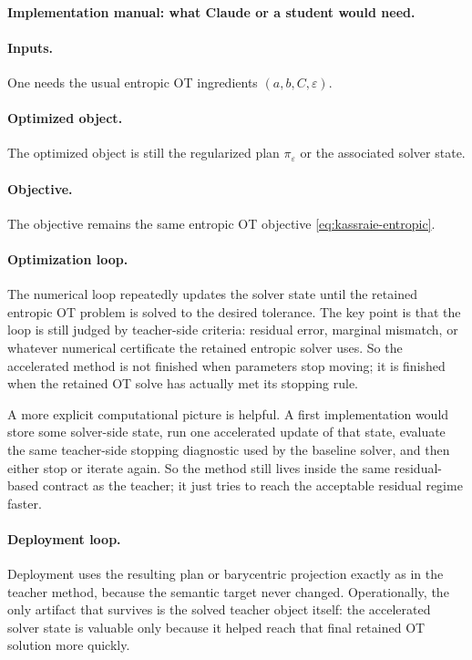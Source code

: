\documentclass[11pt]{report}
\begin{document}
\paragraph{Implementation manual: what Claude or a student would need.}
\paragraph{Inputs.}
One needs the usual entropic OT ingredients $(a,b,C,\varepsilon)$.

\paragraph{Optimized object.}
The optimized object is still the regularized plan $\pi_\varepsilon$ or the
associated solver state.

\paragraph{Objective.}
The objective remains the same entropic OT objective \eqref{eq:kassraie-entropic}.

\paragraph{Optimization loop.}
The numerical loop repeatedly updates the solver state until the retained entropic OT
problem is solved to the desired tolerance.  The key point is that the loop is still
judged by teacher-side criteria: residual error, marginal mismatch, or whatever
numerical certificate the retained entropic solver uses.  So the accelerated method is
not finished when parameters stop moving; it is finished when the retained OT solve
has actually met its stopping rule.

A more explicit computational picture is helpful.  A first implementation would store
some solver-side state, run one accelerated update of that state, evaluate the same
teacher-side stopping diagnostic used by the baseline solver, and then either stop or
iterate again.  So the method still lives inside the same residual-based contract as
the teacher; it just tries to reach the acceptable residual regime faster.

\paragraph{Deployment loop.}
Deployment uses the resulting plan or barycentric projection exactly as in the
teacher method, because the semantic target never changed.  Operationally, the only
artifact that survives is the solved teacher object itself: the accelerated solver
state is valuable only because it helped reach that final retained OT solution more
quickly.
\end{document}
